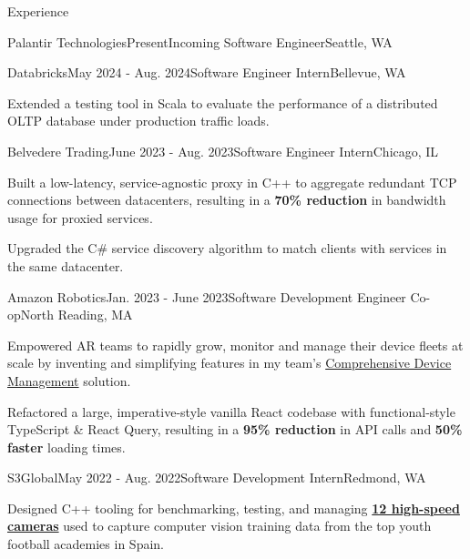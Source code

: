 \documentclass{resume}
\begin{document}
  \vspace{-5pt}
  \begin{rSection}{Experience}

    \begin{rSubsection}{Palantir Technologies}{Present}{Incoming Software Engineer}{Seattle, WA}
    \end{rSubsection}

    \begin{rSubsection}{Databricks}{May 2024 - Aug. 2024}{Software Engineer Intern}{Bellevue, WA}
      \item Extended a testing tool in Scala to evaluate the performance of a distributed
      OLTP database under production traffic loads.
    \end{rSubsection}

    \begin{rSubsection}{Belvedere Trading}{June 2023 - Aug. 2023}{Software Engineer Intern}{Chicago, IL}
      \item Built a low-latency, service-agnostic proxy in C++ to aggregate redundant TCP
        connections between datacenters, resulting in a \textbf{70\% reduction} in bandwidth usage for proxied services.
      \item Upgraded the C\# service discovery algorithm to match clients with services in the same datacenter.
    \end{rSubsection}

    \begin{rSubsection}{Amazon Robotics}{Jan. 2023 - June 2023}{Software Development Engineer Co-op}{North Reading, MA}
      \item Empowered AR teams to rapidly grow, monitor and manage their device fleets at scale by inventing and simplifying
        features in my team's 
        \href{https://www.allthingsdistributed.com/2021/07/amazon-robotics-on-aws.html}{Comprehensive Device Management} solution. 
      \item Refactored a large, imperative-style vanilla React codebase with functional-style 
        TypeScript \& React Query, resulting in a \textbf{95\% reduction} in API calls and \textbf{50\% faster} loading times.
    \end{rSubsection}

    \begin{rSubsection}{S3Global}{May 2022 - Aug. 2022}{Software Development Intern}{Redmond, WA}
    \item Designed C++ tooling for benchmarking, testing, and managing 
      \textbf{\href{https://emergentvisiontec.com/}{12 high-speed cameras}} used to capture 
        computer vision training data from the top youth football academies in Spain.
    \end{rSubsection}

  \end{rSection}
\end{document}
